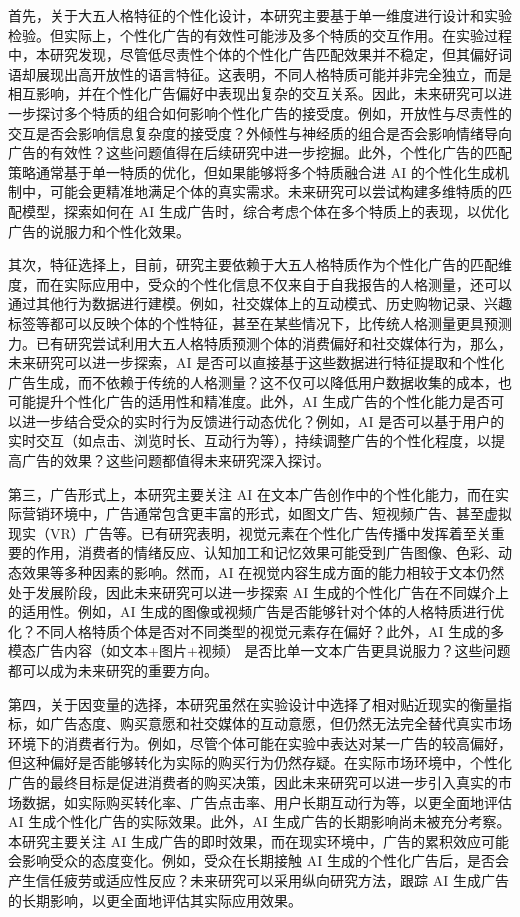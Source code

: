 首先，关于大五人格特征的个性化设计，本研究主要基于单一维度进行设计和实验检验。但实际上，个性化广告的有效性可能涉及多个特质的交互作用。在实验过程中，本研究发现，尽管低尽责性个体的个性化广告匹配效果并不稳定，但其偏好词语却展现出高开放性的语言特征。这表明，不同人格特质可能并非完全独立，而是相互影响，并在个性化广告偏好中表现出复杂的交互关系。因此，未来研究可以进一步探讨多个特质的组合如何影响个性化广告的接受度。例如，开放性与尽责性的交互是否会影响信息复杂度的接受度？外倾性与神经质的组合是否会影响情绪导向广告的有效性？这些问题值得在后续研究中进一步挖掘。此外，个性化广告的匹配策略通常基于单一特质的优化，但如果能够将多个特质融合进 AI 的个性化生成机制中，可能会更精准地满足个体的真实需求。未来研究可以尝试构建多维特质的匹配模型，探索如何在 AI 生成广告时，综合考虑个体在多个特质上的表现，以优化广告的说服力和个性化效果。

其次，特征选择上，目前，研究主要依赖于大五人格特质作为个性化广告的匹配维度，而在实际应用中，受众的个性化信息不仅来自于自我报告的人格测量，还可以通过其他行为数据进行建模。例如，社交媒体上的互动模式、历史购物记录、兴趣标签等都可以反映个体的个性特征，甚至在某些情况下，比传统人格测量更具预测力。已有研究尝试利用大五人格特质预测个体的消费偏好和社交媒体行为\citep{kosinski2013private, golbeck2011predicting}，那么，未来研究可以进一步探索，AI 是否可以直接基于这些数据进行特征提取和个性化广告生成，而不依赖于传统的人格测量？这不仅可以降低用户数据收集的成本，也可能提升个性化广告的适用性和精准度。此外，AI 生成广告的个性化能力是否可以进一步结合受众的实时行为反馈进行动态优化？例如，AI 是否可以基于用户的实时交互（如点击、浏览时长、互动行为等），持续调整广告的个性化程度，以提高广告的效果？这些问题都值得未来研究深入探讨。

第三，广告形式上，本研究主要关注 AI 在文本广告创作中的个性化能力，而在实际营销环境中，广告通常包含更丰富的形式，如图文广告、短视频广告、甚至虚拟现实（VR）广告等。已有研究表明，视觉元素在个性化广告传播中发挥着至关重要的作用，消费者的情绪反应、认知加工和记忆效果可能受到广告图像、色彩、动态效果等多种因素的影响\citep{matz2019predicting,segalin2017your}。然而，AI 在视觉内容生成方面的能力相较于文本仍然处于发展阶段，因此未来研究可以进一步探索 AI 生成的个性化广告在不同媒介上的适用性。例如，AI 生成的图像或视频广告是否能够针对个体的人格特质进行优化？不同人格特质个体是否对不同类型的视觉元素存在偏好？此外，AI 生成的多模态广告内容（如文本+图片+视频）\citep{zhang2024mm} 是否比单一文本广告更具说服力？这些问题都可以成为未来研究的重要方向。

第四，关于因变量的选择，本研究虽然在实验设计中选择了相对贴近现实的衡量指标，如广告态度、购买意愿和社交媒体的互动意愿，但仍然无法完全替代真实市场环境下的消费者行为。例如，尽管个体可能在实验中表达对某一广告的较高偏好，但这种偏好是否能够转化为实际的购买行为仍然存疑。在实际市场环境中，个性化广告的最终目标是促进消费者的购买决策，因此未来研究可以进一步引入真实的市场数据，如实际购买转化率、广告点击率、用户长期互动行为等，以更全面地评估 AI 生成个性化广告的实际效果。此外，AI 生成广告的长期影响尚未被充分考察。本研究主要关注 AI 生成广告的即时效果，而在现实环境中，广告的累积效应可能会影响受众的态度变化。例如，受众在长期接触 AI 生成的个性化广告后，是否会产生信任疲劳或适应性反应？未来研究可以采用纵向研究方法，跟踪 AI 生成广告的长期影响，以更全面地评估其实际应用效果。

